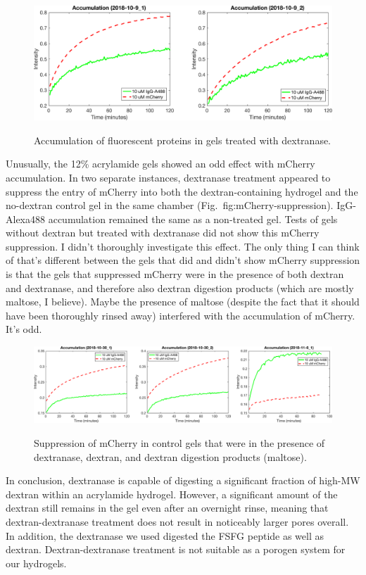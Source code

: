 \begin{figure}
\caption{Accumulation of fluorescent proteins in gels treated with dextranase.}
\centering
\includegraphics[width=\textwidth]{figs/ch03/dxase-results}
\label{fig:dxase-results}
\end{figure}
Unusually, the 12\% acrylamide gels showed an odd effect with mCherry accumulation.  In two separate instances, dextranase treatment appeared to suppress the entry of mCherry into both the dextran-containing hydrogel and the no-dextran control gel in the same chamber (Fig.~{fig:mCherry-suppression}).  IgG-Alexa488 accumulation remained the same as a non-treated gel.  Tests of gels without dextran but treated with dextranase did not show this mCherry suppression.  I didn't thoroughly investigate this effect.  The only thing I can think of that's different between the gels that did and didn't show mCherry suppression is that the gels that suppressed mCherry were in the presence of both dextran and dextranase, and therefore also dextran digestion products (which are mostly maltose, I believe).  Maybe the presence of maltose (despite the fact that it should have been thoroughly rinsed away) interfered with the accumulation of mCherry.  It's odd.
\begin{figure}
\caption{Suppression of mCherry in control gels that were in the presence of dextranase, dextran, and dextran digestion products (maltose).}
\centering
\includegraphics[width=\textwidth]{figs/ch03/mCherry-suppression}
\label{fig:mCherry-suppression}
\end{figure}
In conclusion, dextranase is capable of digesting a significant fraction of high-MW dextran within an acrylamide hydrogel.  However, a significant amount of the dextran still remains in the gel even after an overnight rinse, meaning that dextran-dextranase treatment does not result in noticeably larger pores overall.  In addition, the dextranase we used digested the FSFG peptide as well as dextran.  Dextran-dextranase treatment is not suitable as a porogen system for our hydrogels.

